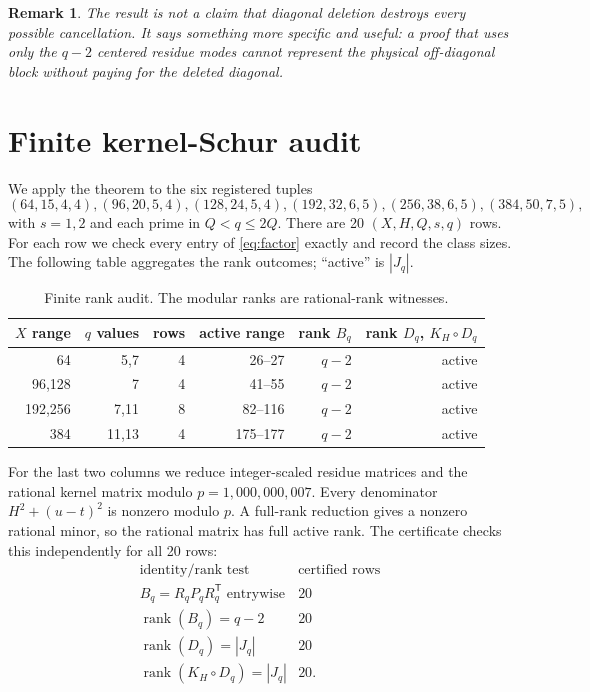 \documentclass[11pt]{article}
\newtheorem{remark}[theorem]{Remark}
\begin{document}
\begin{remark}
The result is not a claim that diagonal deletion destroys every possible
cancellation.  It says something more specific and useful: a proof that uses
only the $q-2$ centered residue modes cannot represent the physical
off-diagonal block without paying for the deleted diagonal.
\end{remark}

\section{Finite kernel-Schur audit}

We apply the theorem to the six registered tuples
\begin{equation}
 (64,15,4,4), (96,20,5,4), (128,24,5,4),
 (192,32,6,5), (256,38,6,5), (384,50,7,5),
 \label{eq:rows}
\end{equation}
with $s=1,2$ and each prime in $Q<q\leq2Q$.  There are 20
$(X,H,Q,s,q)$ rows.  For each row we check every entry of \eqref{eq:factor}
exactly and record the class sizes.  The following table aggregates the rank
outcomes; ``active'' is $|J_q|$.

\begin{table}[t]
\centering
\small
\caption{Finite rank audit.  The modular ranks are rational-rank witnesses.}
\label{tab:ranks}
\begin{tabular}{rrrrrr}
\toprule
$X$ range&$q$ values&rows&active range&rank $B_q$&rank $D_q$, $K_H\circ D_q$\\
\midrule
64&5,7&4&26--27&$q-2$&active\\
96,128&7&4&41--55&$q-2$&active\\
192,256&7,11&8&82--116&$q-2$&active\\
384&11,13&4&175--177&$q-2$&active\\
\bottomrule
\end{tabular}
\end{table}

For the last two columns we reduce integer-scaled residue matrices and the
rational kernel matrix modulo $p=1{,}000{,}000{,}007$.  Every denominator
$H^2+(u-t)^2$ is nonzero modulo $p$.  A full-rank reduction gives a nonzero
rational minor, so the rational matrix has full active rank.  The certificate
checks this independently for all 20 rows:
\begin{equation}
 \begin{array}{c|c}
 \text{identity/rank test}&\text{certified rows}\\ \hline
 B_q=R_qP_qR_q^{\mathsf T}\text{ entrywise}&20\\
 \operatorname{rank}(B_q)=q-2&20\\
 \operatorname{rank}(D_q)=|J_q|&20\\
 \operatorname{rank}(K_H\circ D_q)=|J_q|&20.
 \end{array}
 \label{eq:audit}
\end{equation}
\end{document}
